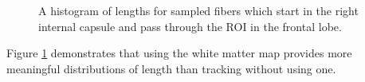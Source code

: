 \begin{figure} \label{fig:twolengthhistograms}
	\caption{A histogram of lengths for sampled fibers which start in the right internal capsule and pass through the ROI in the frontal lobe. }
\end{figure}

Figure \ref{fig:twolengthhistograms} demonstrates that using the white matter map provides more meaningful distributions of length than tracking without using one.

